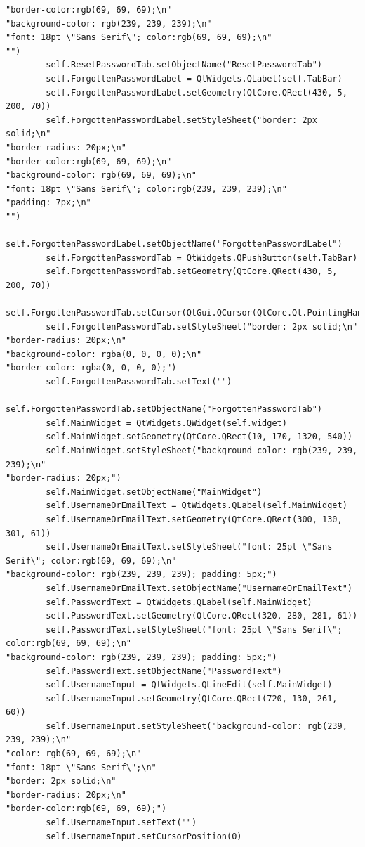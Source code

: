 \documentclass{article}
\begin{document}
\begin{lstlisting}
"border-color:rgb(69, 69, 69);\n"
"background-color: rgb(239, 239, 239);\n"
"font: 18pt \"Sans Serif\"; color:rgb(69, 69, 69);\n"
"")
        self.ResetPasswordTab.setObjectName("ResetPasswordTab")
        self.ForgottenPasswordLabel = QtWidgets.QLabel(self.TabBar)
        self.ForgottenPasswordLabel.setGeometry(QtCore.QRect(430, 5, 200, 70))
        self.ForgottenPasswordLabel.setStyleSheet("border: 2px solid;\n"
"border-radius: 20px;\n"
"border-color:rgb(69, 69, 69);\n"
"background-color: rgb(69, 69, 69);\n"
"font: 18pt \"Sans Serif\"; color:rgb(239, 239, 239);\n"
"padding: 7px;\n"
"")
        self.ForgottenPasswordLabel.setObjectName("ForgottenPasswordLabel")
        self.ForgottenPasswordTab = QtWidgets.QPushButton(self.TabBar)
        self.ForgottenPasswordTab.setGeometry(QtCore.QRect(430, 5, 200, 70))
        self.ForgottenPasswordTab.setCursor(QtGui.QCursor(QtCore.Qt.PointingHandCursor))
        self.ForgottenPasswordTab.setStyleSheet("border: 2px solid;\n"
"border-radius: 20px;\n"
"background-color: rgba(0, 0, 0, 0);\n"
"border-color: rgba(0, 0, 0, 0);")
        self.ForgottenPasswordTab.setText("")
        self.ForgottenPasswordTab.setObjectName("ForgottenPasswordTab")
        self.MainWidget = QtWidgets.QWidget(self.widget)
        self.MainWidget.setGeometry(QtCore.QRect(10, 170, 1320, 540))
        self.MainWidget.setStyleSheet("background-color: rgb(239, 239, 239);\n"
"border-radius: 20px;")
        self.MainWidget.setObjectName("MainWidget")
        self.UsernameOrEmailText = QtWidgets.QLabel(self.MainWidget)
        self.UsernameOrEmailText.setGeometry(QtCore.QRect(300, 130, 301, 61))
        self.UsernameOrEmailText.setStyleSheet("font: 25pt \"Sans Serif\"; color:rgb(69, 69, 69);\n"
"background-color: rgb(239, 239, 239); padding: 5px;")
        self.UsernameOrEmailText.setObjectName("UsernameOrEmailText")
        self.PasswordText = QtWidgets.QLabel(self.MainWidget)
        self.PasswordText.setGeometry(QtCore.QRect(320, 280, 281, 61))
        self.PasswordText.setStyleSheet("font: 25pt \"Sans Serif\"; color:rgb(69, 69, 69);\n"
"background-color: rgb(239, 239, 239); padding: 5px;")
        self.PasswordText.setObjectName("PasswordText")
        self.UsernameInput = QtWidgets.QLineEdit(self.MainWidget)
        self.UsernameInput.setGeometry(QtCore.QRect(720, 130, 261, 60))
        self.UsernameInput.setStyleSheet("background-color: rgb(239, 239, 239);\n"
"color: rgb(69, 69, 69);\n"
"font: 18pt \"Sans Serif\";\n"
"border: 2px solid;\n"
"border-radius: 20px;\n"
"border-color:rgb(69, 69, 69);")
        self.UsernameInput.setText("")
        self.UsernameInput.setCursorPosition(0)

\end{lstlisting}
\end{document}
